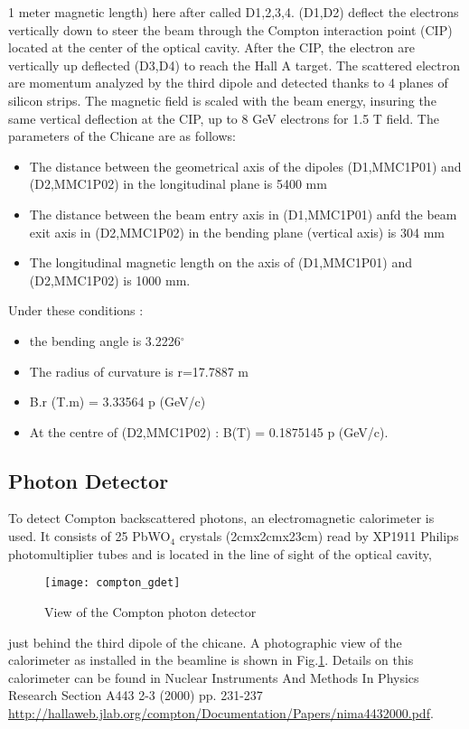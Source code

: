 {1 meter magnetic length) here after called D1,2,3,4.
(D1,D2) deflect  the electrons  vertically down to steer
the beam through the Compton interaction point (CIP) located at the center of
the optical cavity. After the CIP, the electron are vertically up deflected (D3,D4) to reach
the Hall A target. The scattered electron are momentum analyzed by the third dipole and
detected thanks to 4 planes of silicon strips.
The magnetic field is scaled with the beam energy, insuring the same vertical deflection at the CIP,
up to 8 GeV electrons for 1.5 T field. The parameters of the Chicane are as follows:
\begin{itemize}
\item The distance between the geometrical axis of the
        dipoles (D1,MMC1P01) and (D2,MMC1P02) in the longitudinal plane is 5400 mm
	\item The distance between the beam entry axis in (D1,MMC1P01) anfd the
        beam exit axis in (D2,MMC1P02) in the bending plane (vertical axis) is 304 mm
	\item The longitudinal magnetic length on the axis of (D1,MMC1P01) and
	(D2,MMC1P02) is 1000 mm.
\end{itemize}

\par Under these conditions :
\begin{itemize}
    \item the bending angle is 3.2226$^{\circ}$
    \item The radius of curvature is r=17.7887 m
    \item B.r (T.m) = 3.33564 p (GeV/c)
    \item At the centre of (D2,MMC1P02) : B(T) = 0.1875145 p (GeV/c).
\end{itemize}

\subsection{Photon Detector}
To detect Compton backscattered photons, an electromagnetic
calorimeter is used. It consists of 25 PbWO$_4$ crystals (2cmx2cmx23cm) read by XP1911
Philips photomultiplier tubes and is located in the line of sight of the optical cavity,
\label{sec:compton_gdet}
\begin{figure}[htp]
    \begin{center}
        \texttt{[image: compton\_gdet]}
    \end{center}
    \caption[compton:photon detector]{
            View of the Compton photon detector
            }
    \label{fig:compton_gdet}
 \end{figure}
just behind the third  dipole of the chicane. A photographic view of the calorimeter
as installed in the beamline is shown in Fig.\ref{fig:compton_gdet}. Details on this calorimeter can be found
in  Nuclear Instruments And Methods In Physics Research Section A443 2-3 (2000) pp. 231-237
\url{http://hallaweb.jlab.org/compton/Documentation/Papers/nima4432000.pdf}.

}
